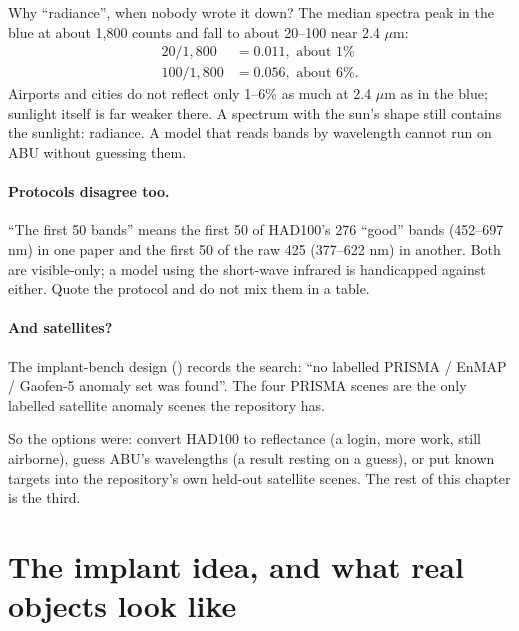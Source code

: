 Why ``radiance'', when nobody wrote it down? The median spectra peak in the blue at about 1,800 counts and fall to
about 20--100 near 2.4 $\mu$m\hfil{}\hfilneg{}:
\begin{align*}
20 / 1{,}800 &= 0.011, \text{ about } 1\%\\
100 / 1{,}800 &= 0.056, \text{ about } 6\%.
\end{align*}
Airports and cities do not reflect only 1--6\% as much at 2.4 $\mu$m as in the blue; sunlight itself is far weaker
there. A spectrum with the sun's shape still contains the sunlight: radiance. A model that reads bands by wavelength
cannot run on ABU without guessing them.

\paragraph{Protocols disagree too.} ``The first 50 bands'' means the first 50 of HAD100's 276 ``good'' bands
(452--697 nm) in one paper and the first 50 of the raw 425 (377--622 nm) in another. Both are visible-only; a model
using the short-wave infrared is handicapped against either. Quote the protocol and do not mix them in a table.

\paragraph{And satellites?} The implant-bench design () records the search: ``no
labelled PRISMA / EnMAP / Gaofen-5 anomaly set was found''. The four PRISMA scenes are the only labelled satellite
anomaly scenes the repository has.


So the options were: convert HAD100 to reflectance (a login, more work, still airborne), guess ABU's wavelengths (a
result resting on a guess), or put known targets into the repository's own held-out satellite scenes. The rest of
this chapter is the third.

\section{The implant idea, and what real objects look like}\label{sec:benchmarks:real}

